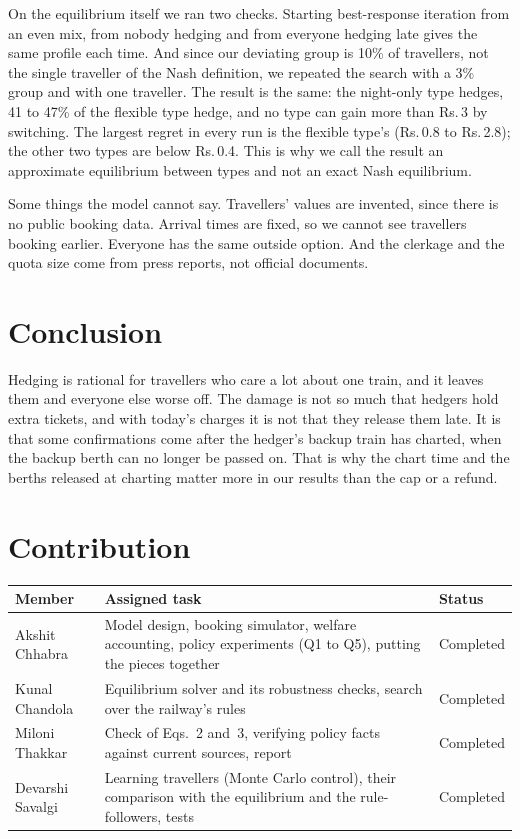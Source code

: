 \documentclass{article}
\newcommand{\rs}{Rs.\,}
\theoremstyle{definition}
\begin{document}
On the equilibrium itself we ran two checks. Starting best-response iteration from an even
mix, from nobody hedging and from everyone hedging late gives the same profile each time.
And since our deviating group is 10\% of travellers, not the single traveller of the Nash
definition, we repeated the search with a 3\% group and with one traveller. The result is
the same: the night-only type hedges, 41 to 47\% of the flexible type hedge, and no type
can gain more than \rs3 by switching. The largest regret in every run is the flexible
type's (\rs0.8 to \rs2.8); the other two types are below \rs0.4. This is why we call the
result an approximate equilibrium between types and not an exact Nash equilibrium.

Some things the model cannot say. Travellers' values are invented, since there is no public
booking data. Arrival times are fixed, so we cannot see travellers booking earlier.
Everyone has the same outside option. And the clerkage and the quota size come from press
reports, not official documents.

\section{Conclusion}

Hedging is rational for travellers who care a lot about one train, and it leaves them and
everyone else worse off. The damage is not so much that hedgers hold extra tickets, and
with today's charges it is not that they release them late. It is that some confirmations
come after the hedger's backup train has charted, when the backup berth can no longer be
passed on. That is why the chart time and the berths released at charting matter more in
our results than the cap or a refund.

\section{Contribution}

\begin{center}
\small
\begin{tabular}{lp{}l}
\toprule
Member & Assigned task & Status \\
\midrule
Akshit Chhabra & Model design, booking simulator, welfare accounting, policy experiments
(Q1 to Q5), putting the pieces together & Completed \\
Kunal Chandola & Equilibrium solver and its robustness checks, search over the railway's
rules & Completed \\
Miloni Thakkar & Check of Eqs.~2 and~3, verifying policy facts against current sources,
report & Completed \\
Devarshi Savalgi & Learning travellers (Monte Carlo control), their comparison with the
equilibrium and the rule-followers, tests & Completed \\
\bottomrule
\end{tabular}
\end{center}
\end{document}
